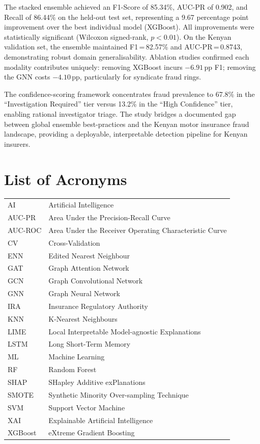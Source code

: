 \documentclass[12pt,a4paper,oneside]{report}
\numberwithin{equation}{chapter}
\begin{document}
The stacked ensemble achieved an F1-Score of 85.34\%, AUC-PR of 0.902, and
Recall of 86.44\% on the held-out test set, representing a 9.67 percentage point
improvement over the best individual model (XGBoost). All improvements were statistically
significant (Wilcoxon signed-rank, $p < 0.01$). On the Kenyan validation set, the ensemble
maintained F1\,=\,82.57\% and AUC-PR\,=\,0.8743, demonstrating robust domain
generalisability. Ablation studies confirmed each modality contributes uniquely: removing
XGBoost incurs $-6.91$\,pp F1; removing the GNN costs $-4.10$\,pp, particularly for
syndicate fraud rings.

The confidence-scoring framework concentrates fraud prevalence to 67.8\% in the
``Investigation Required'' tier versus 13.2\% in the ``High Confidence'' tier, enabling rational
investigator triage. The study bridges a documented gap between global ensemble best-practices
and the Kenyan motor insurance fraud landscape, providing a deployable, interpretable detection
pipeline for Kenyan insurers.



\newpage
\chapter*{List of Acronyms}

\begin{tabular}{ll}
  AI      & Artificial Intelligence \\
  AUC-PR  & Area Under the Precision-Recall Curve \\
  AUC-ROC & Area Under the Receiver Operating Characteristic Curve \\
  CV      & Cross-Validation \\
  ENN     & Edited Nearest Neighbour \\
  GAT     & Graph Attention Network \\
  GCN     & Graph Convolutional Network \\
  GNN     & Graph Neural Network \\
  IRA     & Insurance Regulatory Authority \\
  KNN     & K-Nearest Neighbours \\
  LIME    & Local Interpretable Model-agnostic Explanations \\
  LSTM    & Long Short-Term Memory \\
  ML      & Machine Learning \\
  RF      & Random Forest \\
  SHAP    & SHapley Additive exPlanations \\
  SMOTE   & Synthetic Minority Over-sampling Technique \\
  SVM     & Support Vector Machine \\
  XAI     & Explainable Artificial Intelligence \\
  XGBoost & eXtreme Gradient Boosting \\
\end{tabular}
\end{document}
